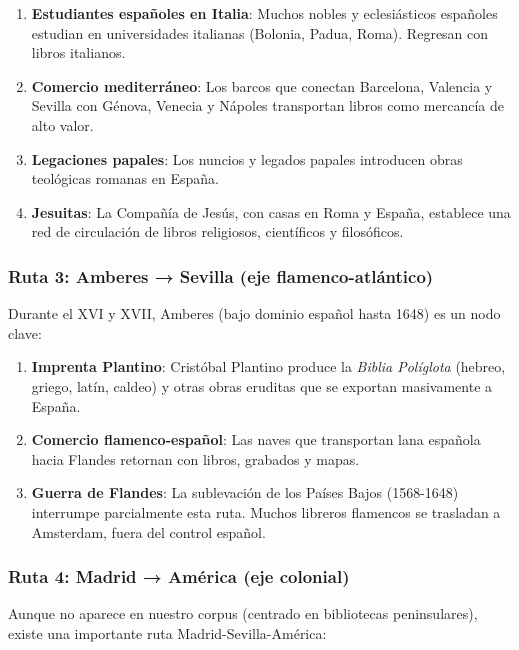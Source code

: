 \documentclass[11pt,a4paper]{article}
\begin{document}
\begin{enumerate}
\item \textbf{Estudiantes españoles en Italia}: Muchos nobles y eclesiásticos españoles estudian en universidades italianas (Bolonia, Padua, Roma). Regresan con libros italianos.

\item \textbf{Comercio mediterráneo}: Los barcos que conectan Barcelona, Valencia y Sevilla con Génova, Venecia y Nápoles transportan libros como mercancía de alto valor.

\item \textbf{Legaciones papales}: Los nuncios y legados papales introducen obras teológicas romanas en España.

\item \textbf{Jesuitas}: La Compañía de Jesús, con casas en Roma y España, establece una red de circulación de libros religiosos, científicos y filosóficos.
\end{enumerate}

\subsubsection{Ruta 3: Amberes → Sevilla (eje flamenco-atlántico)}

Durante el XVI y XVII, Amberes (bajo dominio español hasta 1648) es un nodo clave:

\begin{enumerate}
\item \textbf{Imprenta Plantino}: Cristóbal Plantino produce la \textit{Biblia Políglota} (hebreo, griego, latín, caldeo) y otras obras eruditas que se exportan masivamente a España.

\item \textbf{Comercio flamenco-español}: Las naves que transportan lana española hacia Flandes retornan con libros, grabados y mapas.

\item \textbf{Guerra de Flandes}: La sublevación de los Países Bajos (1568-1648) interrumpe parcialmente esta ruta. Muchos libreros flamencos se trasladan a Amsterdam, fuera del control español.
\end{enumerate}

\subsubsection{Ruta 4: Madrid → América (eje colonial)}

Aunque no aparece en nuestro corpus (centrado en bibliotecas peninsulares), existe una importante ruta Madrid-Sevilla-América:
\end{document}
